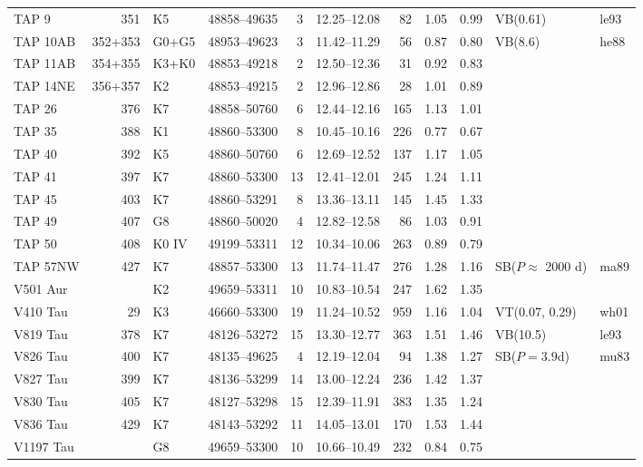 \begin{table}
{\begin{tabular}{lrllrcrllll}
TAP 9     & 351 & K5    & 48858--49635 &  3 & 12.25--12.08 &  82 & 1.05 & 0.99 & VB(0.61) & le93 \\
TAP 10AB &352+353& G0+G5& 48953--49623 &  3 & 11.42--11.29 &  56 & 0.87 & 0.80 & VB(8.6) & he88\\
TAP 11AB &354+355& K3+K0& 48853--49218 &  2 & 12.50--12.36 &  31 & 0.92 & 0.83 & & \\
TAP 14NE &356+357& K2   & 48853--49215 &  2 & 12.96--12.86 &  28 & 1.01 & 0.89 & & \\
TAP 26    & 376 & K7    & 48858--50760 &  6 & 12.44--12.16 & 165 & 1.13 & 1.01 & & \\
TAP 35    & 388 & K1    & 48860--53300 &  8 & 10.45--10.16 & 226 & 0.77 & 0.67 & & \\
TAP 40    & 392 & K5    & 48860--50760 &  6 & 12.69--12.52 & 137 & 1.17 & 1.05 & & \\
TAP 41    & 397 & K7    & 48860--53300 & 13 & 12.41--12.01 & 245 & 1.24 & 1.11 & & \\
TAP 45    & 403 & K7    & 48860--53291 &  8 & 13.36--13.11 & 145 & 1.45 & 1.33 & & \\
TAP 49    & 407 & G8    & 48860--50020 &  4 & 12.82--12.58 &  86 & 1.03 & 0.91 & & \\
TAP 50    & 408 & K0 IV & 49199--53311 & 12 & 10.34--10.06 & 263 & 0.89 & 0.79 & & \\
TAP 57NW  & 427 & K7    & 48857--53300 & 13 & 11.74--11.47 & 276 & 1.28 & 1.16 & SB($P\approx$ 2000 d) & ma89\\
V501 Aur  &     & K2    & 49659--53311 & 10 & 10.83--10.54 & 247 & 1.62 & 1.35 & & \\
V410 Tau  &  29 & K3    & 46660--53300 & 19 & 11.24--10.52 & 959 & 1.16 & 1.04 & VT(0.07, 0.29) & wh01 \\
V819 Tau  & 378 & K7    & 48126--53272 & 15 & 13.30--12.77 & 363 & 1.51 & 1.46 & VB(10.5) & le93\\
V826 Tau  & 400 & K7    & 48135--49625 &  4 & 12.19--12.04 &  94 & 1.38 & 1.27 & SB($P=3.9$d) & mu83 \\
V827 Tau  & 399 & K7    & 48136--53299 & 14 & 13.00--12.24 & 236 & 1.42 & 1.37 & & \\
V830 Tau  & 405 & K7    & 48127--53298 & 15 & 12.39--11.91 & 383 & 1.35 & 1.24 & & \\
V836 Tau  & 429 & K7    & 48143--53292 & 11 & 14.05--13.01 & 170 & 1.53 & 1.44 & & \\
V1197 Tau &     & G8    & 49659--53300 & 10 & 10.66--10.49 & 232 & 0.84 & 0.75 & & \\

\end{tabular}}
\end{table}
